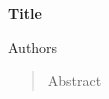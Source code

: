 
\centerline{\Large{\textbf{ Title }}}
\centerline{}
\centerline{Authors}

\begin{abstract}
  Abstract
\end{abstract}
